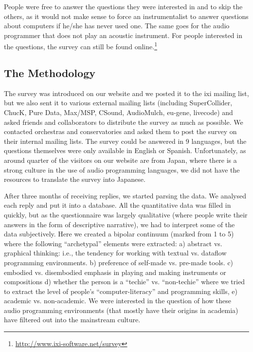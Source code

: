 People were free to answer the questions they were interested in and to skip the
others, as it would not make sense to force an instrumentalist to answer
questions about computers if he/she has never used one. The same goes for the
audio programmer that does not play an acoustic instrument. For people interested
in the questions, the survey can still be found online.\footnote{\url{http://www.ixi-software.net/survey}}

\subsection{The Methodology}
The survey was introduced on our website and we posted it to the ixi mailing
list, but we also sent it to various external mailing lists (including
SuperCollider, ChucK, Pure Data, Max/MSP, CSound, AudioMulch, eu-gene, livecode)
and asked friends and collaborators to distribute the survey as much as possible.
We contacted orchestras and conservatories and asked them to post the survey on
their internal mailing lists. The survey could be answered in 9 languages, but
the questions themselves were only available in English or Spanish.
Unfortunately, as around quarter of the visitors on our website are from Japan,
where there is a strong culture in the use of audio programming languages, we did
not have the resources to translate the survey into Japanese.

After three months of receiving replies, we started parsing the data. We
analysed each reply and put it into a database. All the quantitative data was
filled in quickly, but as the questionnaire was largely qualitative (where people
write their answers in the form of descriptive narrative), we had to interpret
some of the data subjectively. Here we created a bipolar continuum (marked from 1
to 5) where the following ``archetypal'' elements were extracted: a) abstract vs.
graphical thinking: i.e., the tendency for working with textual vs. dataflow
programming environments. b) preference of self-made vs. pre-made tools. c)
embodied vs. disembodied emphasis in playing and making instruments or
compositions d) whether the person is a ``techie'' vs. ``non-techie'' where we
tried to extract the level of people's ``computer-literacy'' and programming
skills, e) academic vs. non-academic. We were interested in the question of how
these audio programming environments (that mostly have their origins in academia)
have filtered out into the mainstream culture.

